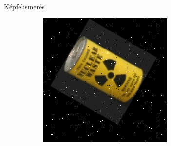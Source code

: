 \documentclass{beamer}
\begin{document}
\begin{frame}{Képfelismerés}
\begin{figure}[tbp]
\begin{subfigure}{0.25\textwidth}
    \includegraphics[width=\textwidth]{figures/noise/pepper1.png}
	\end{subfigure}
\end{figure}
\end{frame}
\end{document}
